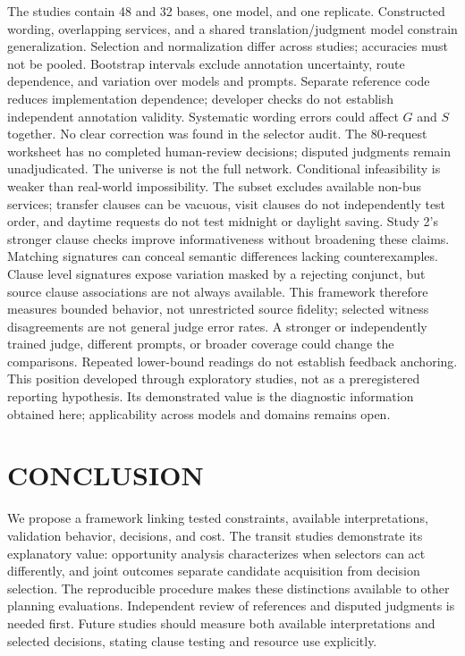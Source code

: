\documentclass[a4paper,twoside]{article}
\begin{document}
\noindent The studies contain 48 and 32 bases, one model, and one replicate. Constructed wording, overlapping services, and a shared translation/judgment model constrain generalization. Selection and normalization differ across studies; accuracies must not be pooled. Bootstrap intervals exclude annotation uncertainty, route dependence, and variation over models and prompts.
Separate reference code reduces implementation dependence; developer checks do not establish independent annotation validity. Systematic wording errors could affect $G$ and $S$ together. No clear correction was found in the selector audit. The 80-request worksheet has no completed human-review decisions; disputed judgments remain unadjudicated.
The universe is not the full network. Conditional infeasibility is weaker than real-world impossibility. The subset excludes available non-bus services; transfer clauses can be vacuous, visit clauses do not independently test order, and daytime requests do not test midnight or daylight saving. Study 2's stronger clause checks improve informativeness without broadening these claims.
Matching signatures can conceal semantic differences lacking counterexamples. Clause level signatures expose variation masked by a rejecting conjunct, but source clause associations are not always available. This framework therefore measures bounded behavior, not unrestricted source fidelity; selected witness disagreements are not general judge error rates.
A stronger or independently trained judge, different prompts, or broader coverage could change the comparisons. Repeated lower-bound readings do not establish feedback anchoring. This position developed through exploratory studies, not as a preregistered reporting hypothesis. Its demonstrated value is the diagnostic information obtained here; applicability across models and domains remains open.



\section{\uppercase{Conclusion}}
\label{sec:conclusion}

\noindent We propose a framework linking tested constraints, available interpretations, validation behavior, decisions, and cost. The transit studies demonstrate its explanatory value: opportunity analysis characterizes when selectors can act differently, and joint outcomes separate candidate acquisition from decision selection. The reproducible procedure makes these distinctions available to other planning evaluations. Independent review of references and disputed judgments is needed first. Future studies should measure both available interpretations and selected decisions, stating clause testing and resource use explicitly. 
\end{document}
